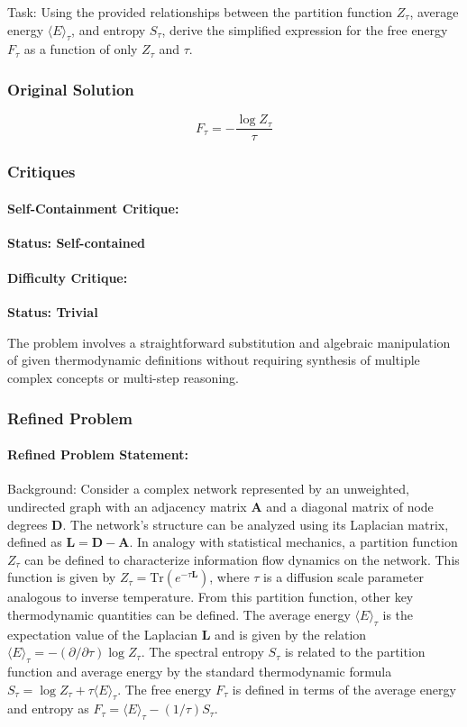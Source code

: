 \documentclass[10pt]{article}
\begin{document}
Task:
Using the provided relationships between the partition function $Z_{\tau}$, average energy $\langle E \rangle_{\tau}$, and entropy $S_{\tau}$, derive the simplified expression for the free energy $F_{\tau}$ as a function of only $Z_{\tau}$ and $\tau$.

\subsubsection*{Original Solution}
\[ F_{\tau} = -\frac{\log Z_{\tau}}{\tau} \]

\subsubsection*{Critiques}
\paragraph*{Self-Containment Critique:}
\textcolor{pass}{\textbf{Status: Self-contained}}




\paragraph*{Difficulty Critique:}
\textcolor{fail}{\textbf{Status: Trivial}}

The problem involves a straightforward substitution and algebraic manipulation of given thermodynamic definitions without requiring synthesis of multiple complex concepts or multi-step reasoning.


\subsubsection*{Refined Problem}
\paragraph*{Refined Problem Statement:}
Background:
Consider a complex network represented by an unweighted, undirected graph with an adjacency matrix $\mathbf{A}$ and a diagonal matrix of node degrees $\mathbf{D}$. The network's structure can be analyzed using its Laplacian matrix, defined as $\mathbf{L = D - A}$. In analogy with statistical mechanics, a partition function $Z_{\tau}$ can be defined to characterize information flow dynamics on the network. This function is given by $Z_{\tau} = \mathrm{Tr}(e^{-\tau \mathbf{L}})$, where $\tau$ is a diffusion scale parameter analogous to inverse temperature. From this partition function, other key thermodynamic quantities can be defined. The average energy $\langle E \rangle_{\tau}$ is the expectation value of the Laplacian $\mathbf{L}$ and is given by the relation $\langle E \rangle_{\tau} = - (\partial/\partial\tau) \log Z_{\tau}$. The spectral entropy $S_{\tau}$ is related to the partition function and average energy by the standard thermodynamic formula $S_{\tau} = \log Z_{\tau} + \tau \langle E \rangle_{\tau}$. The free energy $F_{\tau}$ is defined in terms of the average energy and entropy as $F_{\tau} = \langle E \rangle_{\tau} - (1/\tau) S_{\tau}$.
\end{document}
